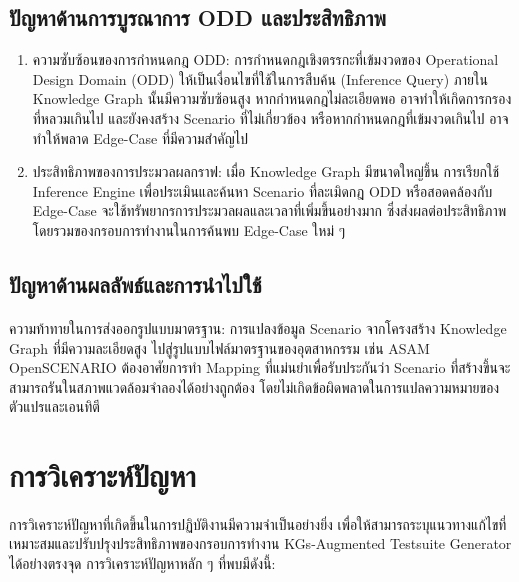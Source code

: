 \subsection{ปัญหาด้านการบูรณาการ ODD และประสิทธิภาพ}\label{subsec:odd-integration-performance}

\begin{enumerate}[label=\arabic*.)]
    \item ความซับซ้อนของการกำหนดกฎ ODD: การกำหนดกฎเชิงตรรกะที่เข้มงวดของ Operational Design Domain (ODD) ให้เป็นเงื่อนไขที่ใช้ในการสืบค้น (Inference Query) ภายใน Knowledge Graph นั้นมีความซับซ้อนสูง หากกำหนดกฎไม่ละเอียดพอ อาจทำให้เกิดการกรองที่หลวมเกินไป และยังคงสร้าง Scenario ที่ไม่เกี่ยวข้อง หรือหากกำหนดกฎที่เข้มงวดเกินไป อาจทำให้พลาด Edge-Case ที่มีความสำคัญไป
    \item ประสิทธิภาพของการประมวลผลกราฟ: เมื่อ Knowledge Graph มีขนาดใหญ่ขึ้น การเรียกใช้ Inference Engine เพื่อประเมินและค้นหา Scenario ที่ละเมิดกฎ ODD หรือสอดคล้องกับ Edge-Case จะใช้ทรัพยากรการประมวลผลและเวลาที่เพิ่มขึ้นอย่างมาก ซึ่งส่งผลต่อประสิทธิภาพโดยรวมของกรอบการทำงานในการค้นพบ Edge-Case ใหม่ ๆ
\end{enumerate}

\subsection{ปัญหาด้านผลลัพธ์และการนำไปใช้}\label{subsec:output-usage}

\paragraph{}
ความท้าทายในการส่งออกรูปแบบมาตรฐาน: การแปลงข้อมูล Scenario จากโครงสร้าง Knowledge Graph ที่มีความละเอียดสูง ไปสู่รูปแบบไฟล์มาตรฐานของอุตสาหกรรม เช่น ASAM OpenSCENARIO ต้องอาศัยการทำ Mapping ที่แม่นยำเพื่อรับประกันว่า Scenario ที่สร้างขึ้นจะสามารถรันในสภาพแวดล้อมจำลองได้อย่างถูกต้อง โดยไม่เกิดข้อผิดพลาดในการแปลความหมายของตัวแปรและเอนทิตี


\section{การวิเคราะห์ปัญหา}\label{sec:problem-analysis}
\paragraph{}

การวิเคราะห์ปัญหาที่เกิดขึ้นในการปฏิบัติงานมีความจำเป็นอย่างยิ่ง เพื่อให้สามารถระบุแนวทางแก้ไขที่เหมาะสมและปรับปรุงประสิทธิภาพของกรอบการทำงาน KGs-Augmented Testsuite Generator ได้อย่างตรงจุด การวิเคราะห์ปัญหาหลัก ๆ ที่พบมีดังนี้:

